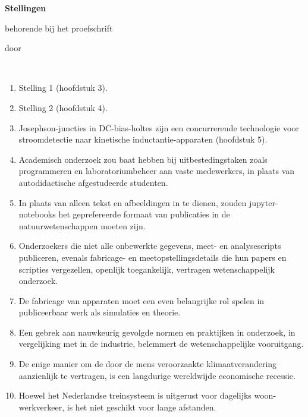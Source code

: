 \documentclass{dissertation-edit}
\begin{document}
\clearpage
{

\begin{center}

{\Large\titlefont\bfseries Stellingen}

\bigskip

behorende bij het proefschrift

\bigskip

{\makeatletter
\titlestyle\bfseries\large\@title
\makeatother}

{\makeatletter
\ifx\@subtitle\undefined\else
    \titlefont\titleshape\@subtitle
\fi
\makeatother}

\bigskip

door

\bigskip

\makeatletter
{\large\titlefont\bfseries\@firstname\ {\titleshape\@lastname}}
\makeatother

\end{center}

\bigskip
\bigskip

\begin{enumerate}

\item Stelling 1 (hoofdstuk 3).
%
\item Stelling 2 (hoofdstuk 4).
%
\item Josephson-juncties in DC-bias-holtes zijn een concurrerende technologie voor stroomdetectie naar kinetische inductantie-apparaten (hoofdstuk 5).
%
\item Academisch onderzoek zou baat hebben bij uitbestedingstaken zoals programmeren en laboratoriumbeheer aan vaste medewerkers, in plaats van autodidactische afgestudeerde studenten.
%
\item In plaats van alleen tekst en afbeeldingen in te dienen, zouden jupyter-notebooks het geprefereerde formaat van publicaties in de natuurwetenschappen moeten zijn.
\item Onderzoekers die niet alle onbewerkte gegevens, meet- en analysescripts publiceren, evenals fabricage- en meetopstellingsdetails die hun papers en scripties vergezellen, openlijk toegankelijk, vertragen wetenschappelijk onderzoek.
%
\item De fabricage van apparaten moet een even belangrijke rol spelen in publiceerbaar werk als simulaties en theorie.
%
\item Een gebrek aan nauwkeurig gevolgde normen en praktijken in onderzoek, in vergelijking met in de industrie, belemmert de wetenschappelijke vooruitgang.
%
\item De enige manier om de door de mens veroorzaakte klimaatverandering aanzienlijk te vertragen, is een langdurige wereldwijde economische recessie.
%
\item Hoewel het Nederlandse treinsysteem is uitgerust voor dagelijks woon-werkverkeer, is het niet geschikt voor lange afstanden.


\end{enumerate}}
\end{document}
